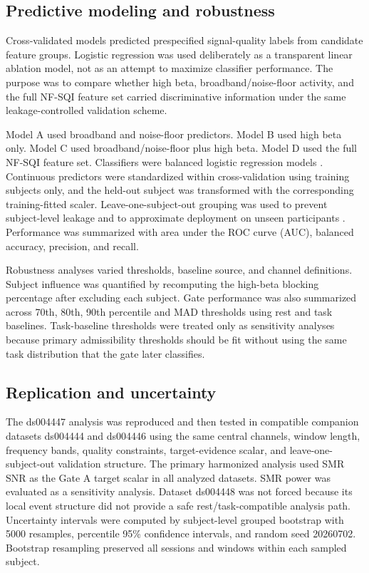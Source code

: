 \documentclass[preprint,12pt]{elsarticle}
\begin{document}
\subsection{Predictive modeling and robustness}

Cross-validated models predicted prespecified signal-quality labels from candidate feature groups. Logistic regression was used deliberately as a transparent linear ablation model, not as an attempt to maximize classifier performance. The purpose was to compare whether high beta, broadband/noise-floor activity, and the full NF-SQI feature set carried discriminative information under the same leakage-controlled validation scheme.

Model A used broadband and noise-floor predictors. Model B used high beta only. Model C used broadband/noise-floor plus high beta. Model D used the full NF-SQI feature set. Classifiers were balanced logistic regression models \citep{Pedregosa2011Scikit}. Continuous predictors were standardized within cross-validation using training subjects only, and the held-out subject was transformed with the corresponding training-fitted scaler. Leave-one-subject-out grouping was used to prevent subject-level leakage and to approximate deployment on unseen participants \citep{Saeb2017UseCase}. Performance was summarized with area under the ROC curve (AUC), balanced accuracy, precision, and recall.

Robustness analyses varied thresholds, baseline source, and channel definitions. Subject influence was quantified by recomputing the high-beta blocking percentage after excluding each subject. Gate performance was also summarized across 70th, 80th, 90th percentile and MAD thresholds using rest and task baselines. Task-baseline thresholds were treated only as sensitivity analyses because primary admissibility thresholds should be fit without using the same task distribution that the gate later classifies.

\subsection{Replication and uncertainty}

The ds004447 analysis was reproduced and then tested in compatible companion datasets ds004444 and ds004446 using the same central channels, window length, frequency bands, quality constraints, target-evidence scalar, and leave-one-subject-out validation structure. The primary harmonized analysis used SMR SNR as the Gate A target scalar in all analyzed datasets. SMR power was evaluated as a sensitivity analysis. Dataset ds004448 was not forced because its local event structure did not provide a safe rest/task-compatible analysis path. Uncertainty intervals were computed by subject-level grouped bootstrap with 5000 resamples, percentile 95\% confidence intervals, and random seed 20260702. Bootstrap resampling preserved all sessions and windows within each sampled subject.
\end{document}
